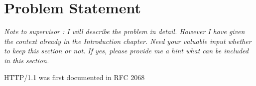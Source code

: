 \chapter{Problem Statement}
\textit{Note to supervisor : I will describe the problem in detail. However I have given the context already in the Introduction chapter. Need your valuable input whether to keep this section or not. If yes, please provide me a hint what can be included in this section. }

HTTP/1.1 was first documented in RFC 2068